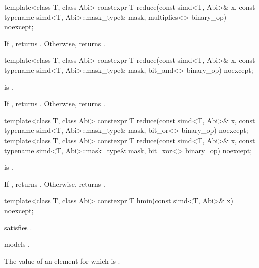 \begin{itemdecl}
template<class T, class Abi>
  constexpr T reduce(const simd<T, Abi>& x, const typename simd<T, Abi>::mask_type& mask,
                     multiplies<> binary_op) noexcept;
\end{itemdecl}

\begin{itemdescr}
  \pnum\returns
  If , returns . Otherwise, returns  \forallmaskedi.
\end{itemdescr}

\begin{itemdecl}
template<class T, class Abi>
  constexpr T reduce(const simd<T, Abi>& x, const typename simd<T, Abi>::mask_type& mask,
                     bit_and<> binary_op) noexcept;
\end{itemdecl}

\begin{itemdescr}
  \pnum\constraints
   is .

  \pnum\returns
  If , returns . Otherwise, returns  \forallmaskedi.
\end{itemdescr}

\begin{itemdecl}
template<class T, class Abi>
  constexpr T reduce(const simd<T, Abi>& x, const typename simd<T, Abi>::mask_type& mask,
                     bit_or<> binary_op) noexcept;
template<class T, class Abi>
  constexpr T reduce(const simd<T, Abi>& x, const typename simd<T, Abi>::mask_type& mask,
                     bit_xor<> binary_op) noexcept;
\end{itemdecl}

\begin{itemdescr}
  \pnum\constraints
   is .

  \pnum\returns
  If , returns . Otherwise, returns  \forallmaskedi.
\end{itemdescr}

\begin{itemdecl}
template<class T, class Abi> constexpr T hmin(const simd<T, Abi>& x) noexcept;
\end{itemdecl}

\begin{itemdescr}
  \pnum\constraints
   satisfies .

  \pnum\expects
   models .

  \pnum\returns
  The value of an element  for which  is  \foralli.
\end{itemdescr}

